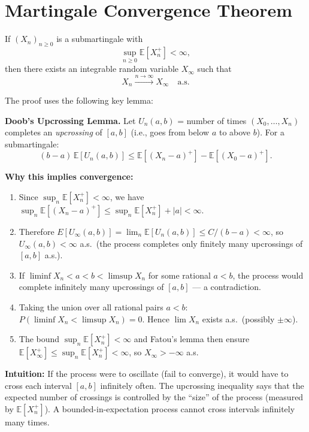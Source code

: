 \documentclass[12pt]{article}
\newcommand{\E}{\mathbb{E}}
\newcommand{\1}{\mathbf{1}}
\begin{document}
\section{Martingale Convergence Theorem}

\begin{tcolorbox}[redbox={Theorem 4.2.11 (Martingale Convergence Theorem)}]
If $(X_n)_{n \ge 0}$ is a submartingale with
\[
  \sup_{n \ge 0} \E[X_n^+] < \infty,
\]
then there exists an integrable random variable $X_\infty$ such that
\[
  X_n \xrightarrow{n \to \infty} X_\infty \quad \text{a.s.}
\]
\end{tcolorbox}

\begin{tcolorbox}[bluebox={Proof Sketch via Upcrossings (Doob's Upcrossing Inequality)}]
The proof uses the following key lemma:

\medskip
\textbf{Doob's Upcrossing Lemma.}  Let $U_n(a,b)$ = number of times $(X_0, \ldots, X_n)$
completes an \emph{upcrossing} of $[a,b]$ (i.e., goes from below $a$ to above $b$).
For a submartingale:
\[
  (b-a)\,\E[U_n(a,b)] \le \E[(X_n - a)^+] - \E[(X_0 - a)^+].
\]

\medskip
\textbf{Why this implies convergence:}
\begin{enumerate}
  \item Since $\sup_n \E[X_n^+] < \infty$, we have $\sup_n \E[(X_n - a)^+] \le \sup_n \E[X_n^+] + |a| < \infty$.
  \item Therefore $E[U_\infty(a,b)] = \lim_n \E[U_n(a,b)] \le C/(b-a) < \infty$,
        so $U_\infty(a,b) < \infty$ a.s.\ (the process completes only finitely many
        upcrossings of $[a,b]$ a.s.).
  \item If $\liminf X_n < a < b < \limsup X_n$ for some rational $a < b$, the process
        would complete infinitely many upcrossings of $[a,b]$ — a contradiction.
  \item Taking the union over all rational pairs $a < b$: $P(\liminf X_n < \limsup X_n) = 0$.
        Hence $\lim X_n$ exists a.s.\ (possibly $\pm\infty$).
  \item The bound $\sup_n \E[X_n^+] < \infty$ and Fatou's lemma then ensure
        $\E[X_\infty^+] \le \sup_n \E[X_n^+] < \infty$, so $X_\infty > -\infty$ a.s.
\end{enumerate}

\medskip
\textbf{Intuition:}  If the process were to oscillate (fail to converge), it would have
to cross each interval $[a,b]$ infinitely often.  The upcrossing inequality says that
the expected number of crossings is controlled by the ``size'' of the process (measured
by $\E[X_n^+]$).  A bounded-in-expectation process cannot cross intervals infinitely
many times.
\end{tcolorbox}
\end{document}
